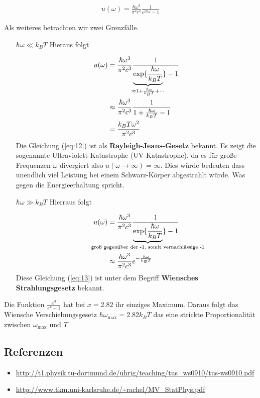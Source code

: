 \begin{align}
  \label{eq:11}
  \boxed{    u(\omega) = \frac{\hbar  \omega^3}{\pi^2  c^3} \frac{1}{e^{\beta \hbar\omega}-1}   }
\end{align}

Als weiteres betrachten wir zwei Grenzfälle.

\begin{itemize}
\item[\(\hbar\omega\ll k_B T\)] Hieraus folgt


  \begin{align}
    \label{eq:12}
   u(\omega) &=  \frac{\hbar  \omega^3}{\pi^2  c^3} \frac{1}{\underbr{\exp\{\frac{\hbar\omega}{k_B T}}_{\approx 1+\frac{\hbar\omega}{k_B T}+\cdots} \}-1} \notag\\
&\approx  \frac{\hbar  \omega^3}{\pi^2  c^3} \frac{1}{  1 + \frac{\hbar\omega}{k_B T} -1} \notag\\
&=  \frac{k_B T \omega^2}{\pi^2  c^3} \notag\\
  \end{align}
Die Gleichung (\ref{eq:12}) ist als \textbf{Rayleigh-Jeans-Gesetz} bekannt. Es zeigt die sogenannte Ultraviolett-Katastrophe (UV-Katastrophe), da es für große Frequenzen \(\omega\) divergiert also \(u(\omega\to \infty)= \infty\). Dies würde bedeuten dass unendlich viel Leistung bei einem Schwarz-Körper abgestrahlt würde. Was gegen die Energieerhaltung spricht.

\item[\(\hbar\omega \gg k_B T\)] Hierraus folgt

  \begin{align}
    \label{eq:13}
    u(\omega) &=  \frac{\hbar  \omega^3}{\pi^2  c^3} \frac{1}{\underbr{\exp\{\frac{\hbar\omega}{k_B T}}_{\text{groß gegenüber der -1, somit vernachlässige -1}} \}-1} \notag\\
 &\approx  \frac{\hbar  \omega^3}{\pi^2  c^3} e^{-\frac{\hbar\omega}{k_B T}} \notag\\
  \end{align}
Diese Gleichung (\ref{eq:13}) ist unter dem Begriff \textbf{Wiensches Strahlungsgesetz} bekannt. 
\end{itemize}

Die Funktion \(\frac{x^3}{e^x-1}\) hat bei \(x=2.82\) ihr einziges Maximum. Daraus folgt das Wiensche Verschiebungsgesetz \(\hbar\omega_{\text{max}}  = 2.82 k_B T\) das eine strickte Proportionalität zwischen \(\omega_{\text{max}}\) und \(T\)


\subsection*{Referenzen}
\begin{itemize}
\item \url{http://t1.physik.tu-dortmund.de/uhrig/teaching/tus_ws0910/tus-ws0910.pdf}
\item \url{http://www.tkm.uni-karlsruhe.de/~rachel/MV_StatPhys.pdf}
\end{itemize}


